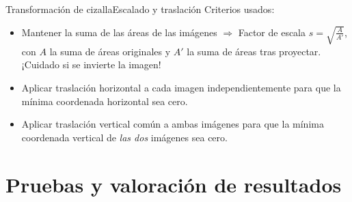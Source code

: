 \documentclass[aspectratio=169,14pt,spanish]{beamer}
\begin{document}
          \begin{frame}{Transformación de cizalla}{Escalado y traslación}
              Criterios usados:
              \begin{itemize}
                  \item Mantener la suma de las áreas de las imágenes $\Longrightarrow$ Factor de escala $s = \sqrt{\frac{A}{A'}}$, con $A$ la suma de áreas originales y $A'$ la suma de áreas tras proyectar. ¡Cuidado si se invierte la imagen!
                  \item Aplicar traslación horizontal a cada imagen independientemente para que la mínima coordenada horizontal sea cero.
                  \item Aplicar traslación vertical común a ambas imágenes para que la mínima coordenada vertical de \emph{las dos} imágenes sea cero.
              \end{itemize}
          \end{frame}



    \section{Pruebas y valoración de resultados}
\end{document}
